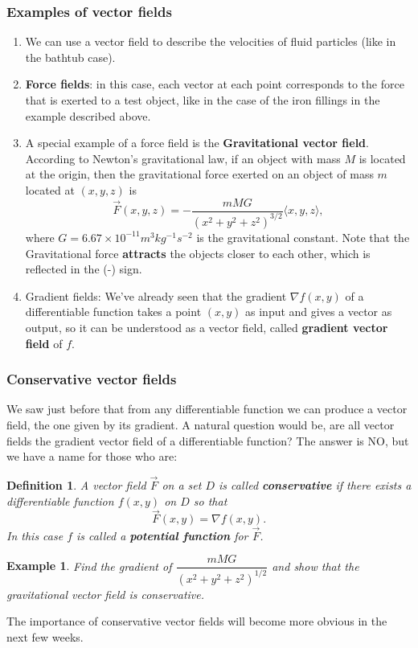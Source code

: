 \documentclass[12pt]{article}
\newcommand{\vF}{\vec{F}}
\renewcommand{\lg}{\langle}
\newcommand{\rg}{\rangle}
\newtheorem{example}{Example}
\newtheorem{definition}{Definition}
\begin{document}
\subsubsection*{Examples of vector fields}
\begin{enumerate}
\item We can use a vector field to describe the velocities of fluid particles (like in the bathtub case).
\item \textbf{Force fields}: in this case, each vector at each point corresponds to the force that is exerted to a test object, like in the case of the iron fillings in the example described above.
\item A special example of a force field is the \textbf{Gravitational vector field}. According to Newton's gravitational law, if an object with mass $M$ is located at the origin, then the gravitational force exerted on an object of mass $m$ located at $(x,y,z)$ is 
$$\vF(x,y,z)=-\frac{mMG}{(x^2+y^2+z^2)^{3/2}}\lg x,y,z\rg,$$ where $G=6.67\times 10^{-11}m^3kg^{-1}s^{-2}$ is the gravitational constant. Note that the Gravitational force \textbf{attracts} the objects closer to each other, which is reflected in the (-) sign.
\item Gradient fields: We've already seen that the gradient $\nabla f(x,y)$ of a differentiable function takes a point $(x,y)$ as input and gives a vector as output, so it can be understood as a vector field, called \textbf{gradient vector field} of $f$.
\end{enumerate}


\subsubsection*{Conservative vector fields}
We saw just before that from any differentiable function we can produce a vector field, the one given by its gradient. A natural question would be, are all vector fields the gradient vector field of a differentiable function? The answer is NO, but we have a name for those who are:
\begin{definition} A vector field $\vF$ on a set $D$ is called \textbf{conservative} if there exists a differentiable function $f(x,y)$ on $D$ so that $$\vF(x,y)=\nabla f(x,y).$$ In this case $f$ is called a \textbf{potential function } for $\vF$. 
\end{definition}
\begin{example} Find the gradient of $\dfrac{mMG}{(x^2+y^2+z^2)^{1/2}}$ and show that the gravitational vector field is conservative.
\end{example}
The importance of conservative vector fields will become more obvious in the next few weeks.
\end{document}
